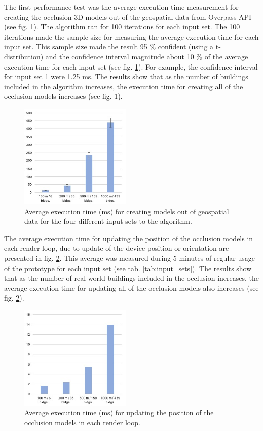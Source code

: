 The first performance test was the average execution time measurement for creating the occlusion 3D models out of the geospatial data from Overpass API (see fig. \ref{fig:_image_performance-create-models}). The algorithm ran for 100 iterations for each input set. The 100 iterations made the sample size for measuring the average execution time for each input set. This sample size made the result 95 \% confident (using a t-distribution) and the confidence interval magnitude about 10 \% of the average execution time for each input set (see fig. \ref{fig:_image_performance-create-models}). For example, the confidence interval for input set 1 were 1.25 ms. The results show that as the number of buildings included in the algorithm increases, the execution time for creating all of the occlusion models increases (see fig. \ref{fig:_image_performance-create-models}). 

\begin{figure}
\includegraphics[width=200px, height=188px]{_image_performance-create-models}
\caption{Average execution time (ms) for creating models out of geospatial data for the four different input sets to the algorithm.}
\label{fig:_image_performance-create-models}
\end{figure}

The average execution time for updating the position of the occlusion models in each render loop, due to update of the device position or orientation are presented in fig. \ref{fig:_image_performance-rendertime}. This average was measured during 5 minutes of regular usage of the prototype for each input set (see tab. \ref{tab:input_sets}). The results show that as the number of real world buildings included in the occlusion increases, the average execution time for updating all of the occlusion models also increases (see fig. \ref{fig:_image_performance-rendertime}).

\begin{figure}
\includegraphics[width=200px, height=188px]{_image_performance-rendertime}
\caption{Average execution time (ms) for updating the position of the occlusion models in each render loop.}
\label{fig:_image_performance-rendertime}
\end{figure}

